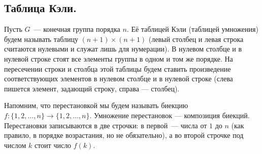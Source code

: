 \documentclass[12pt]{article}
\begin{document}
	\subsection{Таблица Кэли.}
	\begin{definition}
		Пусть $G$~--- конечная группа порядка $n$. Её таблицей Кэли (таблицей умножения) будем называть таблицу $(n + 1) \times (n + 1)$ (левый столбец и левая строка считаются нулевыми и служат лишь для нумерации). В нулевом столбце и в нулевой строке стоят все элементы группы в одном и том же порядке. На пересечении строки и столбца этой таблицы будем ставить произведение соответствующих элементов в нулевом столбце и в нулевой строке (слева пишется элемент, задающий строку, справа — столбец).
	\end{definition}
	\begin{definition}
		Напомним, что перестановкой мы будем называть биекцию $f: \{ 1, 2, \dots, n \} \rightarrow \{ 1, 2, \dots, n \}$. Умножение перестановок — композиция биекций. Перестановки записываются в две строчки: в первой~--- числа от $1$ до $n$ (как правило, в порядке возрастания, но не обязательно), а во второй строчке под числом $k$ стоит число $f(k)$.
	\end{definition}
\end{document}
